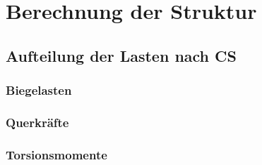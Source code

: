 \chapter{Berechnung der Struktur}\label{cha:Berechnung der Struktur}

\section{Aufteilung der Lasten nach CS}

\subsection{Biegelasten}

\subsection{Querkräfte}

\subsection{Torsionsmomente}
